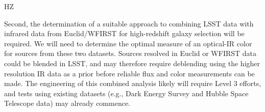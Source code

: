 {\begin{tasklist}{HZ}
\begin{task}
{Second, the determination of a suitable approach to combining LSST data with infrared data from Euclid/WFIRST for high-redshift galaxy selection will be required.
We will need to determine the optimal measure of an optical-IR color for sources from these two datasets. Sources resolved in Euclid or WFIRST data could be blended in LSST, and may therefore
require deblending using the higher resolution IR data as a prior before reliable flux and
color measurements can be made. The engineering of this combined analysis likely will require
Level 3 efforts, and tests using existing datasets (e.g., Dark Energy Survey and Hubble
Space Telescope data) may already commence.}
~\\
\end{task}


\end{tasklist}}
